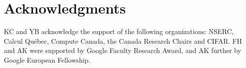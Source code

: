 \documentclass[11pt,letterpaper]{article}
\begin{document}
\section*{Acknowledgments}

KC and YB acknowledge the support of the following organizations: NSERC, Calcul
Qu\'{e}bec, Compute Canada, the Canada Research Chairs and CIFAR. FH and AK
were supported by Google Faculty Research Award, and AK further by Google
European Fellowship.






\end{document}
